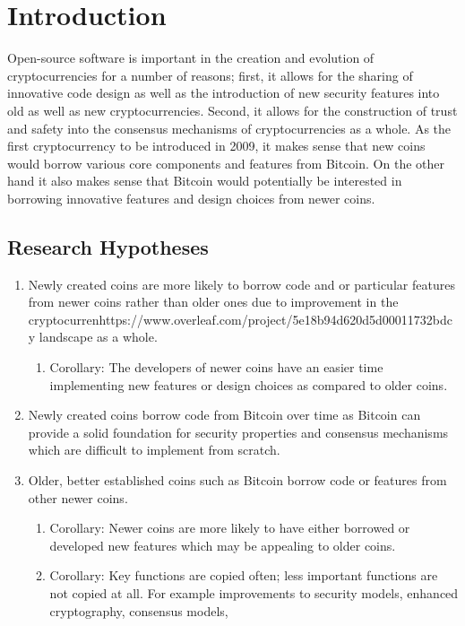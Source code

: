 \section{Introduction}

Open-source software is important in the creation and evolution of cryptocurrencies for a number of reasons; first, it allows for the sharing of innovative code design as well as the introduction of new security features into old as well as new cryptocurrencies. Second, it allows for the construction of trust and safety into the consensus mechanisms of cryptocurrencies as a whole. As the first cryptocurrency to be introduced in 2009, it makes sense that new coins would borrow various core components and features from Bitcoin. On the other hand it also makes sense that Bitcoin would potentially be interested in borrowing innovative features and design choices from newer coins.

\subsection{Research Hypotheses}
\label{sec:hyp}

\begin{enumerate}
    \item Newly created coins are more likely to borrow code and or particular features from newer coins rather than older ones due to improvement in the cryptocurrenhttps://www.overleaf.com/project/5e18b94d620d5d00011732bdcy landscape as a whole.
    \begin{enumerate}
        \item Corollary: The developers of newer coins have an easier time implementing new features or design choices as compared to older coins.
    \end{enumerate}
    \item Newly created coins borrow code from Bitcoin over time as Bitcoin can provide a solid foundation for security properties and consensus mechanisms which are difficult to implement from scratch.
    \item Older, better established coins such as Bitcoin borrow code or features from other newer coins.
    \begin{enumerate}
        \item Corollary: Newer coins are more likely to have either borrowed or developed new features which may be appealing to older coins.
        \item Corollary: Key functions are copied often; less important functions are not copied at all. For example improvements to security models, enhanced cryptography, consensus models, 
    \end{enumerate}
\end{enumerate}

